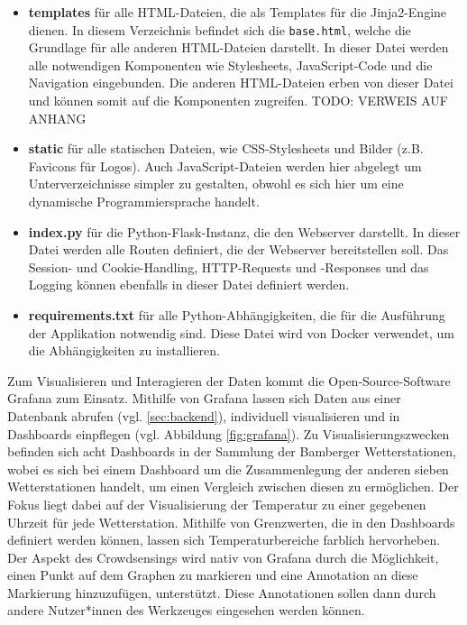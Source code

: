 \begin{itemize}
    \item \textbf{templates} für alle HTML-Dateien, die als Templates für die Jinja2-Engine dienen. In diesem Verzeichnis befindet sich die \texttt{base.html}, welche die Grundlage für alle anderen HTML-Dateien darstellt. In dieser Datei werden alle notwendigen Komponenten wie Stylesheets, JavaScript-Code und die Navigation eingebunden. Die anderen HTML-Dateien erben von dieser Datei und können somit auf die Komponenten zugreifen. TODO: VERWEIS AUF ANHANG
    \item \textbf{static} für alle statischen Dateien, wie CSS-Stylesheets und Bilder (z.B. Favicons für Logos). Auch JavaScript-Dateien werden hier abgelegt um Unterverzeichnisse simpler zu gestalten, obwohl es sich hier um eine dynamische Programmiersprache handelt.
    \item \textbf{index.py} für die Python-Flask-Instanz, die den Webserver darstellt. In dieser Datei werden alle Routen definiert, die der Webserver bereitstellen soll. Das Session- und Cookie-Handling, HTTP-Requests und -Responses und das Logging können ebenfalls in dieser Datei definiert werden.
    \item \textbf{requirements.txt} für alle Python-Abhängigkeiten, die für die Ausführung der Applikation notwendig sind. Diese Datei wird von Docker verwendet, um die Abhängigkeiten zu installieren.
\end{itemize}

Zum Visualisieren und Interagieren der Daten kommt die Open-Source-Software Grafana zum Einsatz. Mithilfe von Grafana lassen sich Daten aus einer Datenbank abrufen (vgl. \ref{sec:backend}), individuell visualisieren und in Dashboards einpflegen (vgl. Abbildung \ref{fig:grafana}). Zu Visualisierungszwecken befinden sich acht Dashboards in der Sammlung der Bamberger Wetterstationen, wobei es sich bei einem Dashboard um die Zusammenlegung der anderen sieben Wetterstationen handelt, um einen Vergleich zwischen diesen zu ermöglichen. Der Fokus liegt dabei auf der Visualisierung der Temperatur zu einer gegebenen Uhrzeit für jede Wetterstation. Mithilfe von Grenzwerten, die in den Dashboards definiert werden können, lassen sich Temperaturbereiche farblich hervorheben. Der Aspekt des Crowdsensings wird nativ von Grafana durch die Möglichkeit, einen Punkt auf dem Graphen zu markieren und eine Annotation an diese Markierung hinzuzufügen, unterstützt. Diese Annotationen sollen dann durch andere Nutzer*innen des Werkzeuges eingesehen werden können.

